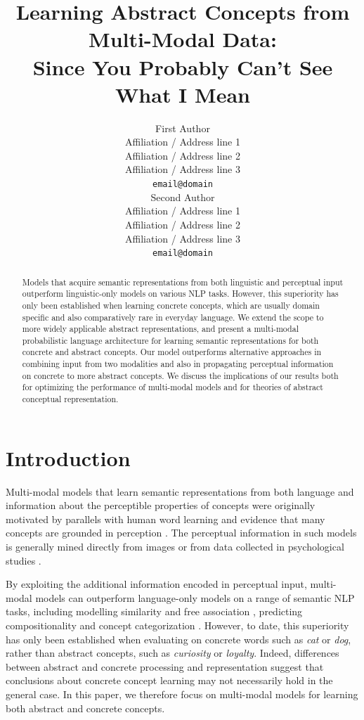 \documentclass[11pt]{article}
\title{Learning Abstract Concepts from Multi-Modal Data: \\ Since You Probably Can't See What I Mean}
\author{First Author \\
  Affiliation / Address line 1 \\
  Affiliation / Address line 2 \\
  Affiliation / Address line 3 \\
  {\tt email@domain} \\\And
  Second Author \\
  Affiliation / Address line 1 \\
  Affiliation / Address line 2 \\
  Affiliation / Address line 3 \\
  {\tt email@domain} \\}
\date{}
\begin{document}
\maketitle

\begin{abstract}



Models that acquire semantic representations from both linguistic and perceptual input outperform linguistic-only models on various NLP tasks. However, this superiority has only been established when learning concrete concepts, which are usually domain specific and also comparatively rare in everyday language. We extend the scope to more widely applicable abstract representations, and present  a multi-modal probabilistic language architecture for learning semantic representations for both concrete and abstract concepts. Our model outperforms alternative approaches in combining input from two modalities and also in propagating perceptual information on concrete to more abstract concepts. We discuss the implications of our results both for optimizing the performance of multi-modal models and for theories of abstract conceptual representation. 




\end{abstract}



\section{Introduction}

Multi-modal models that learn semantic representations from both language and information about the perceptible properties of concepts were originally motivated by parallels with human word learning \cite{andrews2009integrating} and evidence that many concepts are grounded in perception \cite{barsalou2005situating}. The perceptual information in such models is generally mined directly from images \cite{feng2010visual,bruni2012distributional} or from data collected in psychological studies \cite{silberer2012grounded,rollermultimodal}. 

By exploiting the additional information encoded in perceptual input, multi-modal models can outperform language-only models on a range of semantic NLP tasks, including modelling similarity \cite{bruni2014multimodal} and free association \cite{silberer2012grounded}, predicting compositionality \cite{rollermultimodal} and concept categorization \cite{silberer2014learning}. However, to date, this superiority has only been established when evaluating on concrete words such as \emph{cat} or \emph{dog}, rather than abstract concepts, such as \emph{curiosity} or \emph{loyalty}. Indeed, differences between abstract and concrete processing and representation \cite{paivio1991dual,hill2013quantitative} suggest that conclusions about concrete concept learning may not necessarily hold in the general case. In this paper, we therefore focus on multi-modal models for learning both abstract and concrete concepts.
\end{document}
